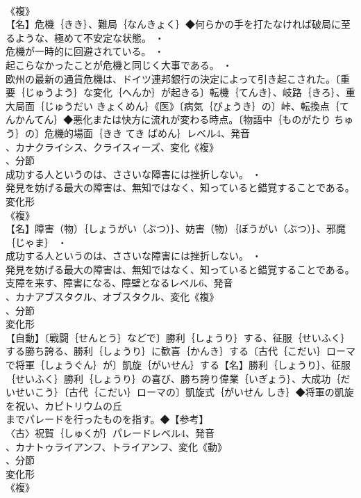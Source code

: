 \documentclass[8pt]{extreport}
\begin{document}
\begin{CJK}{UTF8}{min}
\\	《複》
\\	【名】危機｛きき｝、難局｛なんきょく｝◆何らかの手を打たなければ破局に至るような、極めて不安定な状態。 ・
\\	危機が一時的に回避されている。 ・
\\	起こらなかったことが危機と同じく大事である。 ・
\\	欧州の最新の通貨危機は、ドイツ連邦銀行の決定によって引き起こされた。〔重要｛じゅうよう｝な変化｛へんか｝が起きる〕転機｛てんき｝、岐路｛きろ｝、重大局面｛じゅうだい きょくめん｝《医》〔病気｛びょうき｝の〕峠、転換点｛てんかんてん｝◆悪化または快方に流れが変わる時点。〔物語中｛ものがたり ちゅう｝の〕危機的場面｛きき てき ばめん｝レベル4、発音
\\	、カナクライシス、クライスィーズ、変化《複》
\\	、分節
\\	成功する人というのは、ささいな障害には挫折しない。 ・
\\	発見を妨げる最大の障害は、無知ではなく、知っていると錯覚することである。	変化形 
\\	《複》
\\	【名】障害（物）｛しょうがい（ぶつ）｝、妨害（物）｛ぼうがい（ぶつ）｝、邪魔｛じゃま｝ ・
\\	成功する人というのは、ささいな障害には挫折しない。 ・
\\	発見を妨げる最大の障害は、無知ではなく、知っていると錯覚することである。
\\	支障を来す、障害になる、障壁となるレベル6、発音
\\	、カナアブスタクル、オブスタクル、変化《複》
\\	、分節
\\	変化形 
\\	【自動】〔戦闘｛せんとう｝などで〕勝利｛しょうり｝する、征服｛せいふく｝する勝ち誇る、勝利｛しょうり｝に歓喜｛かんき｝する〔古代｛こだい｝ローマで将軍｛しょうぐん｝が〕凱旋｛がいせん｝する【名】勝利｛しょうり｝、征服｛せいふく｝勝利｛しょうり｝の喜び、勝ち誇り偉業｛いぎょう｝、大成功｛だいせいこう｝〔古代｛こだい｝ローマの〕凱旋式｛がいせん しき｝◆将軍の凱旋を祝い、カピトリウムの丘
\\	までパレードを行ったものを指す。◆【参考】
\\	〈古〉祝賀｛しゅくが｝パレードレベル4、発音
\\	、カナトゥライアンフ、トライアンフ、変化《動》
\\	、分節
\\	変化形 
\\	《複》

\end{CJK}
\end{document}
